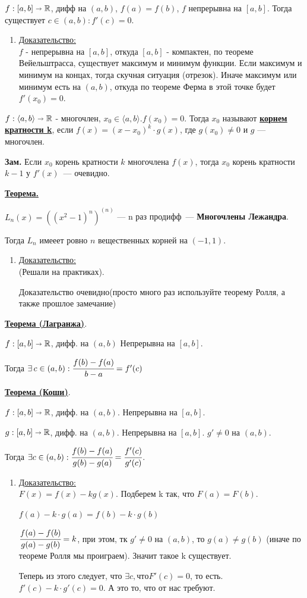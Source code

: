 \documentclass{article}
\newcommand{\deff}[1]{\underline{\textbf{#1}}}
\newcommand{\thmm}[1]{\underline{\textbf{#1}}}
\newcommand{\prooff}[1]{{\underline{Доказательство:}} \\ }
\begin{document}
$f: [a,b] \shortrightarrow \mathbb{R}$, дифф на $(a,b)$, $f(a) = f(b)$, $f$ непрерывна на $[a,b]$. Тогда существует $c \in (a,b): f'(c)=0$.
\begin{enumerate}
    \item[] \prooff{}
    $f $ - непрерывна на $[a,b]$, откуда $[a,b]$ - компактен, по теореме Вейельштрасса, существует максимум и минимум функции. Если максимум и минимум на концах, тогда скучная ситуация (отрезок). Иначе максимум или минимум есть на $(a,b)$, откуда по теореме Ферма в этой точке будет $f'(x_0)=0$.
\end{enumerate}

$f:\langle a,b\rangle \shortrightarrow \mathbb{R}$ - многочлен, $x_0 \in \langle a,b\rangle. f(x_0) =0 $. Тогда $x_0$ называют \deff{корнем кратности k}, если $f(x) = (x-x_0)^k \cdot g(x)$, где $g(x_0) \neq 0$ и $g$ --- многочлен.

\textbf{Зам.} Если $x_0$ корень кратности $k$ многочлена $f(x)$, тогда $x_0$ корень кратности $k-1$ у $f'(x)$~--- очевидно.

\thmm{Теорема.}

$L_n(x) = ((x^2-1)^n)^{(n)}$ --- n раз продифф~--- \textbf{Многочлены Лежандра}.

Тогда $L_n$ имееет ровно $n$ вещественных корней на $(-1,1)$.
\begin{enumerate}
    \item[] \prooff{}
    (Решали на практиках). 
    
    Доказательство очевидно(просто много раз используйте теорему Ролля, а также прошлое замечание)
\end{enumerate}

\thmm{Теорема (Лагранжа)}.

$f: [a,b] \shortrightarrow \mathbb{R}$, дифф. на $(a,b)$ Непрерывна на $[a,b]$. 

Тогда $\exists \, c \in (a,b): \cfrac{f(b)-f(a)}{b-a} = f'(c)$

\thmm{Теорема (Коши)}.

$f: [a,b] \shortrightarrow \mathbb{R}$, дифф. на $(a,b)$. Непрерывна на $[a,b]$.

$g: [a,b] \shortrightarrow \mathbb{R}$, дифф. на $(a,b)$. Непрерывна на $[a,b]$. $g'\neq 0$ на $(a,b)$.

Тогда $\exists c \in (a,b): \cfrac{f(b)-f(a)}{g(b)-g(a)} = \cfrac{f'(c)}{g'(c)}$.
\begin{enumerate}
    \item[] \prooff{}
    $F(x) = f(x) - k g(x)$. Подберем k так, что  $F(a) = F(b)$.

    $f(a) - k \cdot g(a) = f(b) - k \cdot g(b)$

    $\cfrac{f(a)-f(b)}{g(a) - g(b)} = k$, при этом, тк $g'\neq 0$ на $(a,b)$, то $g(a) \neq g(b)$ (иначе по теореме Ролля мы проиграем). Значит такое k существует.

    Теперь из этого следует, что $\exists c, что F'(c) = 0$, то есть. 
    $f'(c) -  k \cdot g'(c) = 0$. А это то, что от нас требуют.  
\end{enumerate}
\end{document}
